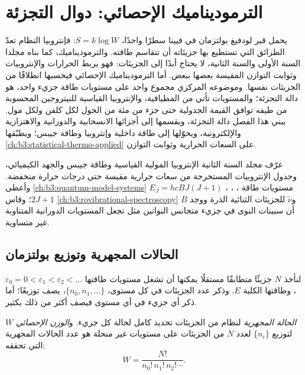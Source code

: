 \chapter{الترموديناميك الإحصائي: دوال التجزئة}\label{ch:b3:partition-functions}

يحمل قبر لودفيغ بولتزمان في فيينا سطرًا واحدًا، $S = k\log W$: فإنتروبيا
النظام تعدّ الطرائق التي تستطيع بها جزيئاته أن تتقاسم طاقته.
والترموديناميك، كما بناه مجلدا السنة الأولى والسنة الثانية، لا يحتاج أبدًا إلى
الجزيئات: فهو يربط الحرارات والإنتروبيات وثوابت التوازن المقيسة بعضها
ببعض. أما الترموديناميك الإحصائي فيحسبها انطلاقًا من الجزيئات
نفسها. وموضوعه المركزي مجموع واحد على مستويات طاقة جزيء
واحد، هو دالة التجزئة؛ والمستويات تأتي من المطيافية، 
والإنتروبيا القياسية للنيتروجين المحسوبة من طيفه توافق
القيمة الجدولية حتى جزء من مئة من الجول لكل كلفن ولكل مول. يبني هذا الفصل
دالة التجزئة، ويقسمها إلى أجزائها الانسحابية والدورانية
والاهتزازية والإلكترونية، ويحوّلها إلى طاقة داخلية وإنتروبيا
وطاقة جيبس؛ ويطبّقها \cref{ch:b3:statistical-thermo-applied} على السعات
الحرارية وثوابت التوازن.

\begin{recall}
عرّف مجلد السنة الثانية الإنتروبيا المولية القياسية وطاقة جيبس 
والجهد الكيميائي، وجدول الإنتروبيات المستخرجة من سعات حرارية
مقيسة حتى درجات حرارة منخفضة. وأعطى \cref{ch:b3:quantum-model-systems}
مستويات طاقة ، ، 
، $E_J = hcBJ(J+1)$  $2J + 1$؛
وقاس \cref{ch:b3:rovibrational-spectroscopy} $B$ و$\tilde\nu$ للجزيئات
الثنائية الذرة ووجد أن سبينات النوى في جزيء متجانس النواتين مثل 
تجعل المستويات الدورانية المتناوبة غير متساوية.
\end{recall}

\section{الحالات المجهرية وتوزيع بولتزمان}

لنأخذ $N$ جزيئًا متطابقًا مستقلًا يمكنها أن تشغل مستويات طاقتها
$\varepsilon_0 = 0 < \varepsilon_1 < \varepsilon_2 < \dots$، وطاقتها الكلية $E$. وذكر عدد
الجزيئات في كل مستوى، $\{n_0, n_1, \dots\}$، يصف توزيعًا؛ أما
ذكر أي جزيء في أي مستوى فيصف أكثر من ذلك بكثير.

\begin{definition}\label{def:b3:partition-functions:microstate}
\emph{الحالة المجهرية} لنظام من الجزيئات تحديد
كامل لحالة كل جزيء. و\emph{الوزن
الإحصائي} $W$ لتوزيع $\{n_i\}$ لعدد $N$ من الجزيئات على
مستويات غير منحلة هو عدد الحالات المجهرية التي تحققه:
\[
  W = \frac{N!}{n_0!\,n_1!\,n_2!\cdots}.
\]
\end{definition}

